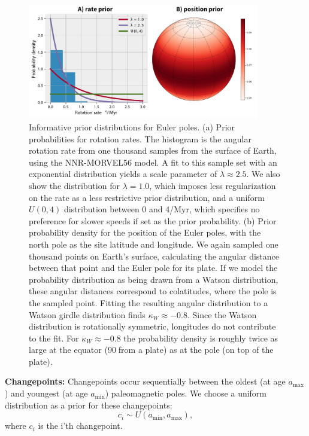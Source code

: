 \documentclass[11pt,letterpaper]{article}
\begin{document}
\begin{figure}
\centering
\includegraphics[width=0.9\textwidth]{fig_euler_pole_prior.pdf}
\caption[Informative prior distributions for Euler poles]{Informative prior distributions for Euler poles. (a) Prior probabilities for rotation rates. The histogram is the angular rotation rate from one thousand samples from the surface of Earth, using the NNR-MORVEL56 model. A fit to this sample set with an exponential distribution yields a scale parameter of $\lambda \approx 2.5$. We also show the distribution for $\lambda = 1.0$, which imposes less regularization on the rate as a less restrictive prior distribution, and a uniform $U(0,4)$ distribution between 0 and 4\textdegree/Myr, which specifies no preference for slower speeds if set as the prior probability. (b) Prior probability density for the position of the Euler poles, with the north pole as the site latitude and longitude.  We again sampled one thousand points on Earth's surface, calculating the angular distance between that point and the Euler pole for its plate.  If we model the probability distribution as being drawn from a Watson distribution, these angular distances correspond to colatitudes, where the pole is the sampled point.  Fitting the resulting angular distribution to a Watson girdle distribution finds $\kappa_W \approx -0.8$. Since the Watson distribution is rotationally symmetric, longitudes do not contribute to the fit. For $\kappa_W \approx -0.8$ the probability density is roughly twice as large at the equator (90\textdegree$\;$from a plate) as at the pole (on top of the plate).}
\label{fig:euler_pole_prior}
\end{figure}

\textbf{Changepoints:} 
Changepoints occur sequentially between the oldest (at age $a_\mathrm{max}$) and youngest (at age $a_\mathrm{min}$) paleomagnetic poles. We choose a uniform distribution as a prior for these changepoints:
\begin{equation}
c_i \sim U( a_\mathrm{min}, a_\mathrm{max}),
\end{equation}
where $c_i$ is the i'th changepoint.
\end{document}
